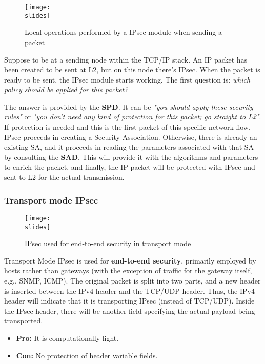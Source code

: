 \begin{figure}[h]
    \centering
    \texttt{[image: \\slides]}
    \caption{Local operations performed by a IPsec module when sending a packet}
\end{figure}

Suppose to be at a sending node within the TCP/IP stack. An IP packet has been created to be sent at L2, but on this node there's IPsec. When the packet is ready to be sent, the IPsec module starts working. The first question is: \textit{which policy should be applied for this packet?}

The answer is provided by the \textbf{SPD}. It can be \textit{"you should apply these security rules"} or \textit{"you don't need any kind of protection for this packet; go straight to L2"}.
If protection is needed and this is the first packet of this specific network flow, IPsec proceeds in creating a Security Association. Otherwise, there is already an existing SA, and it proceeds in reading the parameters associated with that SA by consulting the \textbf{SAD}. This will provide it with the algorithms and parameters to enrich the packet, and finally, the IP packet will be protected with IPsec and sent to L2 for the actual transmission.



\subsubsection{Transport mode IPsec}
\begin{figure}[h]
    \centering
    \texttt{[image: \\slides]}
    \caption{IPsec used for end-to-end security in transport mode}
\end{figure}

Transport Mode IPsec is used for \textbf{end-to-end security}, primarily employed by hosts rather than gateways (with the exception of traffic for the gateway itself, e.g., SNMP, ICMP). The original packet is split into two parts, and a new header is inserted between the IPv4 header and the TCP/UDP header. Thus, the IPv4 header will indicate that it is transporting IPsec (instead of TCP/UDP). Inside the IPsec header, there will be another field specifying the actual payload being transported.
\begin{itemize}
    \item \textbf{Pro:} It is computationally light.
    \item \textbf{Con:} No protection of header variable fields.
\end{itemize}


